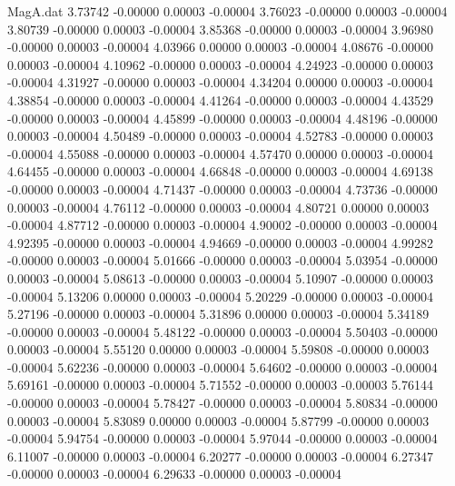 \begin{filecontents}{MagA.dat}
   3.73742   -0.00000    0.00003   -0.00004
   3.76023   -0.00000    0.00003   -0.00004
   3.80739   -0.00000    0.00003   -0.00004
   3.85368   -0.00000    0.00003   -0.00004
   3.96980   -0.00000    0.00003   -0.00004
   4.03966    0.00000    0.00003   -0.00004
   4.08676   -0.00000    0.00003   -0.00004
   4.10962   -0.00000    0.00003   -0.00004
   4.24923   -0.00000    0.00003   -0.00004
   4.31927   -0.00000    0.00003   -0.00004
   4.34204    0.00000    0.00003   -0.00004
   4.38854   -0.00000    0.00003   -0.00004
   4.41264   -0.00000    0.00003   -0.00004
   4.43529   -0.00000    0.00003   -0.00004
   4.45899   -0.00000    0.00003   -0.00004
   4.48196   -0.00000    0.00003   -0.00004
   4.50489   -0.00000    0.00003   -0.00004
   4.52783   -0.00000    0.00003   -0.00004
   4.55088   -0.00000    0.00003   -0.00004
   4.57470    0.00000    0.00003   -0.00004
   4.64455   -0.00000    0.00003   -0.00004
   4.66848   -0.00000    0.00003   -0.00004
   4.69138   -0.00000    0.00003   -0.00004
   4.71437   -0.00000    0.00003   -0.00004
   4.73736   -0.00000    0.00003   -0.00004
   4.76112   -0.00000    0.00003   -0.00004
   4.80721    0.00000    0.00003   -0.00004
   4.87712   -0.00000    0.00003   -0.00004
   4.90002   -0.00000    0.00003   -0.00004
   4.92395   -0.00000    0.00003   -0.00004
   4.94669   -0.00000    0.00003   -0.00004
   4.99282   -0.00000    0.00003   -0.00004
   5.01666   -0.00000    0.00003   -0.00004
   5.03954   -0.00000    0.00003   -0.00004
   5.08613   -0.00000    0.00003   -0.00004
   5.10907   -0.00000    0.00003   -0.00004
   5.13206    0.00000    0.00003   -0.00004
   5.20229   -0.00000    0.00003   -0.00004
   5.27196   -0.00000    0.00003   -0.00004
   5.31896    0.00000    0.00003   -0.00004
   5.34189   -0.00000    0.00003   -0.00004
   5.48122   -0.00000    0.00003   -0.00004
   5.50403   -0.00000    0.00003   -0.00004
   5.55120    0.00000    0.00003   -0.00004
   5.59808   -0.00000    0.00003   -0.00004
   5.62236   -0.00000    0.00003   -0.00004
   5.64602   -0.00000    0.00003   -0.00004
   5.69161   -0.00000    0.00003   -0.00004
   5.71552   -0.00000    0.00003   -0.00003
   5.76144   -0.00000    0.00003   -0.00004
   5.78427   -0.00000    0.00003   -0.00004
   5.80834   -0.00000    0.00003   -0.00004
   5.83089    0.00000    0.00003   -0.00004
   5.87799   -0.00000    0.00003   -0.00004
   5.94754   -0.00000    0.00003   -0.00004
   5.97044   -0.00000    0.00003   -0.00004
   6.11007   -0.00000    0.00003   -0.00004
   6.20277   -0.00000    0.00003   -0.00004
   6.27347   -0.00000    0.00003   -0.00004
   6.29633   -0.00000    0.00003   -0.00004

\end{filecontents}
